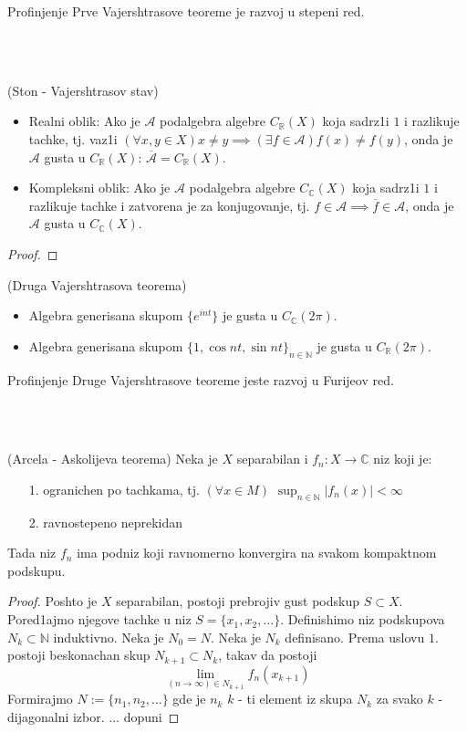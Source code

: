 \documentclass[a4paper,12pt]{article}
\newcommand{\NN}{\mathbb{N}}
\newcommand{\RR}{\mathbb{R}}
\newcommand{\CC}{\mathbb{C}}
\newcommand{\ps}{\subset}
\begin{document}
\begin{nap}
Profinjenje Prve Vajershtrasove teoreme je razvoj u stepeni red.
\end{nap}
\\ \\
\begin{tma}
(Ston - Vajershtrasov stav)
\begin{itemize}
\item Realni oblik: Ako je $\mathcal{A}$ podalgebra algebre $C_{\RR}(X)$ koja sadrz1i $1$ i razlikuje tachke, tj. vaz1i $(\forall x,y \in X) x \ne y \implies (\exists f \in \mathcal{A}) f(x) \ne f(y)$, onda je $\mathcal{A}$ gusta u $C_{\RR}(X)$: $\overline{\mathcal{A}} = C_{\RR}(X)$.
\item Kompleksni oblik: Ako je $\mathcal{A}$ podalgebra algebre $C_{\CC}(X)$ koja sadrz1i $1$ i razlikuje tachke i zatvorena je za kon\-jugovanje, tj. $f \in \mathcal{A} \implies \overline{f} \in \mathcal{A}$, onda je $\mathcal{A}$ gusta u $C_{\CC}(X)$.
\end{itemize}
\end{tma}
\begin{proof}

\end{proof}

\begin{posl}
(Druga Vajershtrasova teorema)
\begin{itemize}
\item Algebra generisana skupom $\{e^{i n t}\}$ je gusta u $C_{\CC}(2 \pi)$.
\item  Algebra generisana skupom ${\{1, \cos nt, \sin nt \}}_{n \in \NN}$ je gusta u $C_{\RR}(2 \pi)$.
\end{itemize}
\end{posl}

\begin{nap}
Profinjenje Druge Vajershtrasove teoreme jeste razvoj u Furijeov red.
\end{nap}
\\ \\
\begin{tma}
(Arcela - Askolijeva teorema) Neka je $X$ separabilan i $f_n: X \to \CC$ niz koji je:
\begin{itemize}
\item[1.] ogranichen po tachkama, tj. $(\forall x \in M)$ $\sup_{n \in \NN} |f_n(x)| < \infty$
\item[2.] ravnostepeno neprekidan
\end{itemize}
Tada niz $f_n$ ima podniz koji ravnomerno konvergira na svakom kompaktnom podskupu.
\end{tma}
\begin{proof}
Poshto je $X$ separabilan, postoji prebrojiv gust podskup $S \ps X$. Pored1ajmo njegove tachke u niz $S = \{x_1, x_2, \dots \}$. Definishimo niz podskupova $N_k \ps \NN$ induktivno. Neka je $N_0 = N$. Neka je $N_k$ definisano. Prema uslovu $1.$ postoji beskonachan skup $N_{k+1} \ps N_k$, takav da postoji 
\[\lim_{(n \to \infty) \in N_{k+1}} f_n(x_{k+1}) \]
Formirajmo $N := \{n_1, n_2, \dots \}$ gde je $n_k$ $k$ - ti element iz skupa $N_k$ za svako $k$ - dijagonalni izbor.  ... dopuni
\end{proof}
\end{document}
